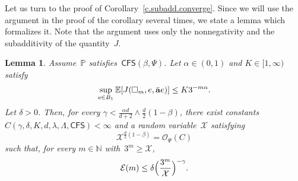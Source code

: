 \documentclass[11pt]{article} %
\let\oldsquare\square %
\renewcommand{\square}{\oldsquare}
\numberwithin{equation}{section}
\newtheorem{lemma}[theorem]{Lemma}
\theoremstyle{definition}
\let\originalleft\left
\let\originalright\right
\renewcommand{\left}{\mathopen{}\mathclose\bgroup\originalleft}
\renewcommand{\right}{\aftergroup\egroup\originalright}
\newcommand*{\N}{\ensuremath{\mathbb{N}}}
\renewcommand{\a}{\mathbf{a}}
\newcommand{\ahom}{\bar{\a}}
\newcommand{\cu}{\square}
\renewcommand{\P}{\mathbb{P}}
\newcommand{\E}{\mathbb{E}}
\newcommand{\X}{\mathcal{X}}
\renewcommand{\O}{\mathcal{O}}
\newcommand{\CFS}{\mathsf{CFS}}
\begin{document}
Let us turn to the proof of Corollary~\ref{c.subadd.converge}. 
Since we will use the argument in the proof of the corollary several times, we state a lemma which formalizes it. Note that the argument uses only the nonnegativity and the subadditivity of the quantity~$J$. 

\begin{lemma}
\label{l.mathcalE.minscale}
Assume~$\P$ satisfies~$\CFS(\beta,\Psi)$. Let $\alpha \in (0,1)$ and $K\in[1,\infty)$ satisfy
\begin{align}
\label{e.EJtozero.rate.ass}
\sup_{e\in B_1}
\E \left[ J(\cu_m,e,\ahom e) \right] 
\leq 
K 3^{-m\alpha}. 
\end{align}
Let $\delta>0$. 
Then, for every
$\gamma < \frac{\alpha d}{d+2} \wedge \frac d2(1-\beta)$, 
there exist constants $C(\gamma,\delta,K,d,\lambda,\Lambda,\CFS)<\infty$ and a random variable~$\X$ satisfying 
\begin{equation}
\label{e.minscaleint}
\X^{\frac d2 (1-\beta)}
=
\O_{\Psi}(C) 
\end{equation}
such that, for every $m \in \N$ with~$3^m\geq \X$,
\begin{equation}
\label{e.convssmaxsmax}
\mathcal{E}(m) 
\leq
\delta 
\Bigl( \frac{3^m}{\X} \Bigr)^{-\gamma}.
\end{equation}
\end{lemma}
\end{document}
